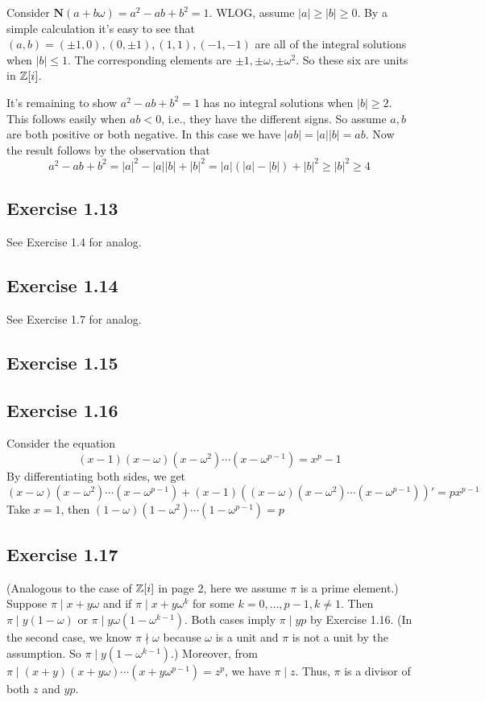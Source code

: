 \documentclass[../Marcus.tex]{subfiles}
\begin{document}
Consider $\mathbf{N}(a+b\omega)=a^2-ab+b^2=1$. WLOG, assume $|a|\geq|b|\geq0$. By a simple calculation it's easy to see that $(a,b)=(\pm1,0),(0,\pm1),(1,1),(-1,-1)$ are all of the integral solutions when $|b|\leq1$. The corresponding elements are $\pm1,\pm\omega,\pm\omega^2$. So these six are units in $\mathbb{Z}[i]$.

It's remaining to show $a^2-ab+b^2=1$ has no integral solutions when $|b|\geq 2$. This follows easily when $ab<0$, i.e., they have the different signs. So assume $a,b$ are both positive or both negative. In this case we have $|ab|=|a||b|=ab$. Now the result follows by the observation that $$a^2-ab+b^2=|a|^2-|a||b|+|b|^2=|a|(|a|-|b|)+|b|^2\geq |b|^2\geq 4$$

\subsection*{Exercise 1.13}

See Exercise 1.4 for analog.

\subsection*{Exercise 1.14}

See Exercise 1.7 for analog.

\subsection*{Exercise 1.15}

\subsection*{Exercise 1.16}

Consider the equation $$(x-1)(x-\omega)(x-\omega^2)\cdots(x-\omega^{p-1})=x^p-1$$ By differentiating both sides, we get $$(x-\omega)(x-\omega^2)\cdots(x-\omega^{p-1})+(x-1)\left ( (x-\omega)(x-\omega^2)\cdots(x-\omega^{p-1}) \right )'=px^{p-1}$$
Take $x=1$, then $(1-\omega)(1-\omega^2)\cdots(1-\omega^{p-1})=p$

\subsection*{Exercise 1.17}

(Analogous to the case of $\mathbb{Z}[i]$ in page 2, here we assume $\pi$ is a prime element.) Suppose $\pi\mid x+y\omega$ and if $\pi\mid x+y\omega^k$ for some $k=0,\ldots,p-1,k\neq 1$. Then $\pi\mid y(1-\omega)$ or $\pi\mid y\omega(1-\omega^{k-1})$. Both cases imply $\pi\mid yp$ by Exercise 1.16. (In the second case, we know $\pi\nmid \omega$ because $\omega$ is a unit and $\pi$ is not a unit by the assumption. So $\pi\mid y(1-\omega^{k-1})$.) Moreover, from $\pi\mid (x+y)(x+y\omega)\cdots(x+y\omega^{p-1})=z^p$, we have $\pi\mid z$. Thus, $\pi$ is a divisor of both $z$ and $yp$.
\end{document}
